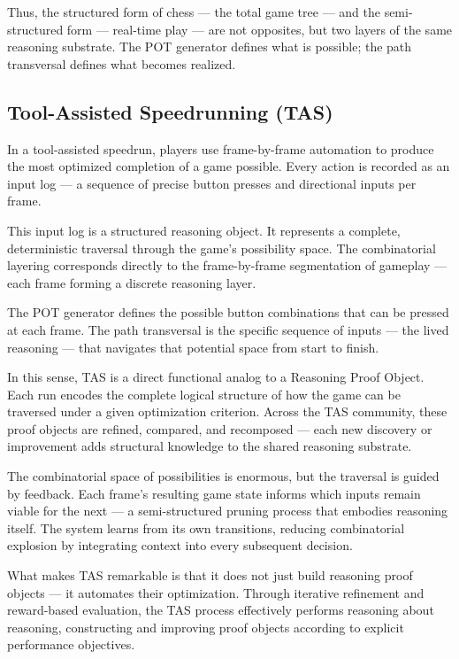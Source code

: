\documentclass[11pt]{article}
\begin{document}
Thus, the structured form of chess --- the total game tree --- and the semi-structured form --- real-time play --- are not opposites, but two layers of the same reasoning substrate. The POT generator defines what is possible; the path transversal defines what becomes realized.

\subsection{Tool-Assisted Speedrunning (TAS)}

In a tool-assisted speedrun, players use frame-by-frame automation to produce the most optimized completion of a game possible. Every action is recorded as an input log --- a sequence of precise button presses and directional inputs per frame.

This input log is a structured reasoning object. It represents a complete, deterministic traversal through the game’s possibility space. The combinatorial layering corresponds directly to the frame-by-frame segmentation of gameplay --- each frame forming a discrete reasoning layer.

The POT generator defines the possible button combinations that can be pressed at each frame. The path transversal is the specific sequence of inputs --- the lived reasoning --- that navigates that potential space from start to finish.

In this sense, TAS is a direct functional analog to a Reasoning Proof Object. Each run encodes the complete logical structure of how the game can be traversed under a given optimization criterion. Across the TAS community, these proof objects are refined, compared, and recomposed --- each new discovery or improvement adds structural knowledge to the shared reasoning substrate.

The combinatorial space of possibilities is enormous, but the traversal is guided by feedback. Each frame’s resulting game state informs which inputs remain viable for the next --- a semi-structured pruning process that embodies reasoning itself. The system learns from its own transitions, reducing combinatorial explosion by integrating context into every subsequent decision.

What makes TAS remarkable is that it does not just build reasoning proof objects --- it automates their optimization. Through iterative refinement and reward-based evaluation, the TAS process effectively performs reasoning about reasoning, constructing and improving proof objects according to explicit performance objectives.
\end{document}
